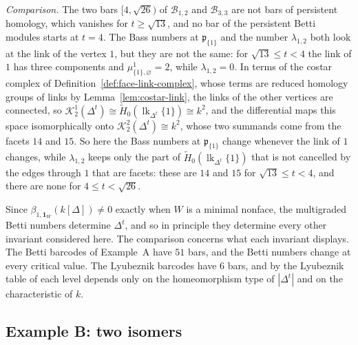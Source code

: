 \documentclass[11pt]{article}
\theoremstyle{plain}
\theoremstyle{definition}
\begin{document}
\emph{Comparison.} The two bars $[4,\sqrt{26})$ of $\mathcal B_{1,2}$ and $\mathcal B_{3,3}$ are not bars of persistent homology, which vanishes for $t\ge\sqrt{13}$, and no bar of the persistent Betti modules starts at $t=4$. The Bass numbers at $\mathfrak{p}_{\{1\}}$ and the number $\lambda_{1,2}$ both look at the link of the vertex $1$, but they are not the same: for $\sqrt{13}\le t<4$ the link of $1$ has three components and $\mu^1_{\{1\},\varnothing}=2$, while $\lambda_{1,2}=0$. In terms of the costar complex of Definition~\ref{def:face-link-complex}, whose terms are reduced homology groups of links by Lemma~\ref{lem:costar-link}, the links of the other vertices are connected, so $\mathcal K^1_2(\Delta^t)\cong\widetilde{H}_0(\operatorname{lk}_{\Delta^t}\{1\})\cong k^2$, and the differential maps this space isomorphically onto $\mathcal K^2_2(\Delta^t)\cong k^2$, whose two summands come from the facets $14$ and $15$. So here the Bass numbers at $\mathfrak{p}_{\{1\}}$ change whenever the link of $1$ changes, while $\lambda_{1,2}$ keeps only the part of $\widetilde{H}_0(\operatorname{lk}_{\Delta^t}\{1\})$ that is not cancelled by the edges through $1$ that are facets: these are $14$ and $15$ for $\sqrt{13}\le t<4$, and there are none for $4\le t<\sqrt{26}$.

Since $\beta_{1,\mathbf 1_W}(k[\Delta])\ne0$ exactly when $W$ is a minimal nonface, the multigraded Betti numbers determine $\Delta^t$, and so in principle they determine every other invariant considered here. The comparison concerns what each invariant displays. The Betti barcodes of Example~A have $51$ bars, and the Betti numbers change at every critical value. The Lyubeznik barcodes have $6$ bars, and by \cite{AlvarezMontanerYanagawa} the Lyubeznik table of each level depends only on the homeomorphism type of $|\Delta^t|$ and on the characteristic of $k$.

\subsection{Example B: two isomers}\label{app:exB}
\end{document}
